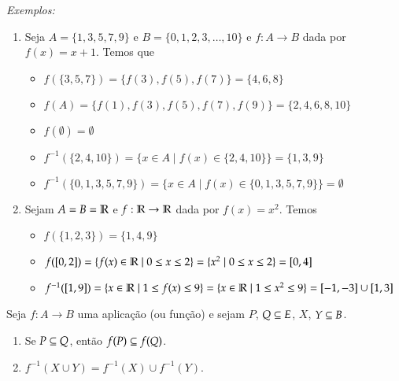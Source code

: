 {\it Exemplos:}
\begin{enumerate}
\item Seja $A = \{1, 3, 5, 7, 9 \}$ e $B = \{0, 1, 2, 3, \dots, 10\}$ e $f : A \to B$ dada por $f(x) = x + 1$. Temos que
\begin{itemize}
\item $f(\{3, 5, 7\}) = \{f(3), f(5), f(7)\} = \{4, 6, 8\}$

\item $f(A) = \{f(1), f(3), f(5), f(7), f(9)\} = \{2, 4, 6, 8, 10\}$

\item $f(\emptyset) = \emptyset$

\item $f^{-1}(\{2, 4, 10\}) = \{x \in A \mid f(x) \in \{2, 4, 10\}\} = \{1, 3, 9\}$

\item $f^{-1}(\{0, 1, 3, 5, 7, 9\}) = \{x \in A \mid f(x) \in \{0, 1, 3, 5, 7, 9\}\} = \emptyset$
\end{itemize}

\item Sejam $A = B= \mathbb{R}$ e $f : \mathbb{R} \to \mathbb{R}$ dada por $f(x) = x^2$. Temos
\begin{itemize}
\item $f(\{1, 2, 3\}) = \{1, 4, 9\}$

\item $f([0,2]) = \{f(x) \in \mathbb{R} \mid 0 \le x \le 2 \} = \{x^2 \mid 0 \le x \le 2\} = [0, 4]$

\item $f^{-1}([1, 9]) = \{ x \in \mathbb{R} \mid 1 \le f(x) \le 9\} = \{x \in \mathbb{R} \mid 1 \le x^2 \le 9\} = [-1, -3] \cup [1, 3]$
\end{itemize}
\end{enumerate}

\begin{proposicao}
Seja $f : A \to B$ uma aplica{\c c}{\~a}o (ou fun{\c c}{\~a}o) e sejam $P$, $Q \subseteq E$, $X$, $Y \subseteq B$.
\begin{enumerate}
\item Se $P \subseteq Q$, ent{\~a}o $f(P) \subseteq f(Q)$.

\item $f^{-1}(X \cup Y) = f^{-1}(X) \cup f^{-1}(Y)$.
\end{enumerate}
\end{proposicao}


